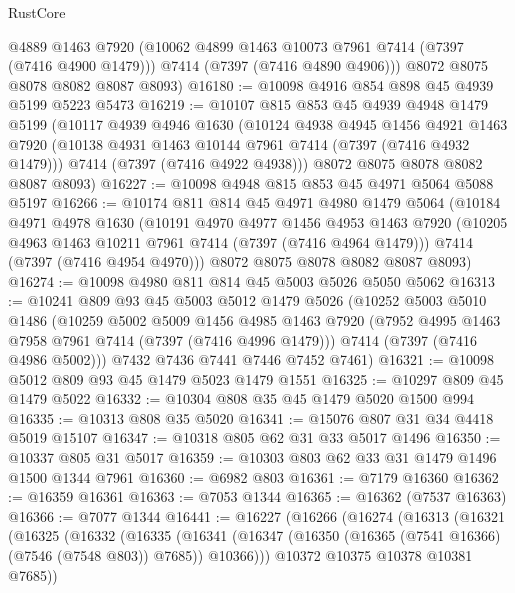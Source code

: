 \begin{lexlean}{RustCore}
\begin{coremodule}
        @4889
        @1463
        @7920
        (@10062 @4899 @1463 @10073 @7961 @7414 (@7397 (@7416 @4900 @1479)))
        @7414
        (@7397 (@7416 @4890 @4906)))
      @8072
      @8075
      @8078
      @8082
      @8087
      @8093)
@16180 := @10098 @4916 @854 @898 @45 @4939 @5199 @5223 @5473
@16219 := @10107
    @815
    @853
    @45
    @4939
    @4948
    @1479
    @5199
    (@10117
      @4939
      @4946
      @1630
      (@10124
        @4938
        @4945
        @1456
        @4921
        @1463
        @7920
        (@10138 @4931 @1463 @10144 @7961 @7414 (@7397 (@7416 @4932 @1479)))
        @7414
        (@7397 (@7416 @4922 @4938)))
      @8072
      @8075
      @8078
      @8082
      @8087
      @8093)
@16227 := @10098 @4948 @815 @853 @45 @4971 @5064 @5088 @5197
@16266 := @10174
    @811
    @814
    @45
    @4971
    @4980
    @1479
    @5064
    (@10184
      @4971
      @4978
      @1630
      (@10191
        @4970
        @4977
        @1456
        @4953
        @1463
        @7920
        (@10205 @4963 @1463 @10211 @7961 @7414 (@7397 (@7416 @4964 @1479)))
        @7414
        (@7397 (@7416 @4954 @4970)))
      @8072
      @8075
      @8078
      @8082
      @8087
      @8093)
@16274 := @10098 @4980 @811 @814 @45 @5003 @5026 @5050 @5062
@16313 := @10241
    @809
    @93
    @45
    @5003
    @5012
    @1479
    @5026
    (@10252
      @5003
      @5010
      @1486
      (@10259
        @5002
        @5009
        @1456
        @4985
        @1463
        @7920
        (@7952 @4995 @1463 @7958 @7961 @7414 (@7397 (@7416 @4996 @1479)))
        @7414
        (@7397 (@7416 @4986 @5002)))
      @7432
      @7436
      @7441
      @7446
      @7452
      @7461)
@16321 := @10098 @5012 @809 @93 @45 @1479 @5023 @1479 @1551
@16325 := @10297 @809 @45 @1479 @5022
@16332 := @10304 @808 @35 @45 @1479 @5020 @1500 @994
@16335 := @10313 @808 @35 @5020
@16341 := @15076 @807 @31 @34 @4418 @5019 @15107
@16347 := @10318 @805 @62 @31 @33 @5017 @1496
@16350 := @10337 @805 @31 @5017
@16359 := @10303 @803 @62 @33 @31 @1479 @1496 @1500 @1344 @7961
@16360 := @6982 @803
@16361 := @7179 @16360
@16362 := @16359 @16361
@16363 := @7053 @1344
@16365 := @16362 (@7537 @16363)
@16366 := @7077 @1344
@16441 := @16227
    (@16266
      (@16274
        (@16313
          (@16321
            (@16325
              (@16332
                (@16335
                  (@16341
                    (@16347 (@16350 (@16365 (@7541 @16366) (@7546 (@7548 @803)) @7685)) @10366)))
                @10372
                @10375
                @10378
                @10381
                @7685))

\end{coremodule}
\end{lexlean}
